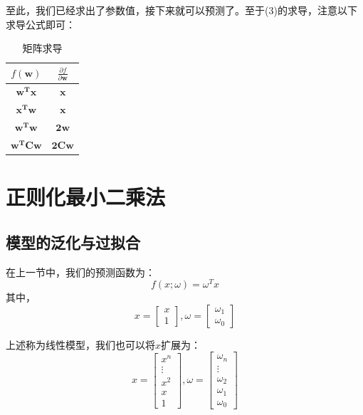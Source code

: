 \documentclass[a4paper,12pt]{book}
\begin{document}
    
    至此，我们已经求出了参数值，接下来就可以预测了。至于(3)的求导，注意以下求导公式即可：
    \begin{table}[h]
        \centering  %
	    \caption{矩阵求导}  %
	    \label{table1}  %
        \begin{tabular}{|c|c|}  
            \hline  %
            $f(\boldsymbol{w})$&$\frac{\partial{f}}{\partial{\boldsymbol{w}}}$ \\  %
            \hline
            $\boldsymbol{w^Tx}$&$\boldsymbol{x}$ \\
            \hline
            $\boldsymbol{x^Tw}$&$\boldsymbol{x}$ \\
            \hline
            $\boldsymbol{w^Tw}$&$\boldsymbol{2w}$\\
            \hline
            $\boldsymbol{w^TCw}$&$\boldsymbol{2Cw}$\\
            \hline
        \end{tabular}
    \end{table}

    \chapter{正则化最小二乘法}
    \section{模型的泛化与过拟合}

    在上一节中，我们的预测函数为：
    $$f(x;\omega) = \omega^Tx$$
    其中，
    $$
    x=\begin{bmatrix}
    x\\
    1
    \end{bmatrix},
    \omega=\begin{bmatrix}
    \omega_1\\
    \omega_0
    \end{bmatrix}
    $$


    上述称为线性模型，我们也可以将$x$扩展为：
    $$
    x=\begin{bmatrix}
    x^n\\
    \vdots\\
    x^2\\
    x\\
    1
    \end{bmatrix},
    \omega=\begin{bmatrix}
    \omega_n\\
    \vdots\\
    \omega_2\\
    \omega_1\\
    \omega_0
    \end{bmatrix}
    $$
\end{document}
